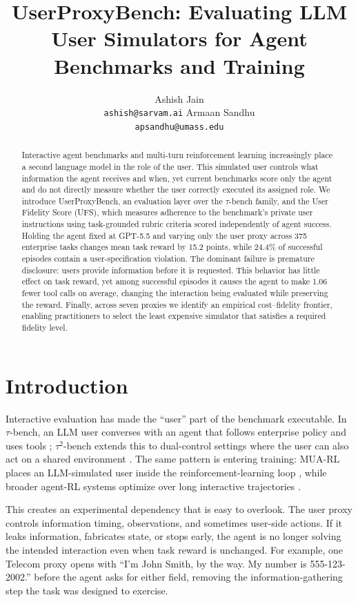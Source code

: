 \documentclass{article}
\title{UserProxyBench: Evaluating LLM User Simulators for Agent Benchmarks and Training}
\author{%
  Ashish Jain\\
  \texttt{ashish@sarvam.ai}
  \And
  Armaan Sandhu\\
  \texttt{apsandhu@umass.edu}
}
\begin{document}
\maketitle

\begin{abstract}
Interactive agent benchmarks and multi-turn reinforcement learning increasingly place a second language model in the role of the user. This simulated user controls what information the agent receives and when, yet current benchmarks score only the agent and do not directly measure whether the user correctly executed its assigned role. We introduce UserProxyBench, an evaluation layer over the \(\tau\)-bench family, and the User Fidelity Score (UFS), which measures adherence to the benchmark's private user instructions using task-grounded rubric criteria scored independently of agent success. Holding the agent fixed at GPT-5.5 and varying only the user proxy across 375 enterprise tasks changes mean task reward by 15.2 points, while 24.4\% of successful episodes contain a user-specification violation. The dominant failure is premature disclosure: users provide information before it is requested. This behavior has little effect on task reward, yet among successful episodes it causes the agent to make 1.06 fewer tool calls on average, changing the interaction being evaluated while preserving the reward. Finally, across seven proxies we identify an empirical cost--fidelity frontier, enabling practitioners to select the least expensive simulator that satisfies a required fidelity level.
\end{abstract}


\section{Introduction}
Interactive evaluation has made the ``user'' part of the benchmark executable. In $\tau$-bench, an LLM user converses with an agent that follows enterprise policy and uses tools \citep{yao2024taubench}; $\tau^2$-bench extends this to dual-control settings where the user can also act on a shared environment \citep{barres2025tau2}. The same pattern is entering training: MUA-RL places an LLM-simulated user inside the reinforcement-learning loop \citep{zhao2025muarl}, while broader agent-RL systems optimize over long interactive trajectories \citep{wang2025ragen,luo2025agentlightning}.

This creates an experimental dependency that is easy to overlook. The user proxy controls information timing, observations, and sometimes user-side actions. If it leaks information, fabricates state, or stops early, the agent is no longer solving the intended interaction even when task reward is unchanged. For example, one Telecom proxy opens with ``I'm John Smith, by the way. My number is 555-123-2002.'' before the agent asks for either field, removing the information-gathering step the task was designed to exercise.
\end{document}

